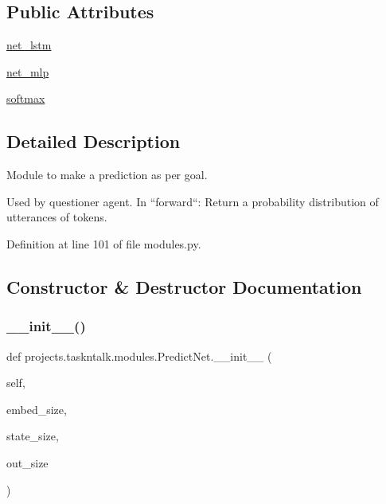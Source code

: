 \subsection*{Public Attributes}
\begin{DoxyCompactItemize}
\item 
\hyperlink{classprojects_1_1taskntalk_1_1modules_1_1PredictNet_ad1120f3386bd6612376876ba51804285}{net\+\_\+lstm}
\item 
\hyperlink{classprojects_1_1taskntalk_1_1modules_1_1PredictNet_ac4f309ddfe1d817c3d345f390604322e}{net\+\_\+mlp}
\item 
\hyperlink{classprojects_1_1taskntalk_1_1modules_1_1PredictNet_ade00e095f7c5b6a29284e514d7aaaf44}{softmax}
\end{DoxyCompactItemize}


\subsection{Detailed Description}
\begin{DoxyVerb}Module to make a prediction as per goal.

Used by questioner agent. In
``forward``: Return a probability distribution of utterances of tokens.
\end{DoxyVerb}
 

Definition at line 101 of file modules.\+py.



\subsection{Constructor \& Destructor Documentation}
\mbox{\label{classprojects_1_1taskntalk_1_1modules_1_1PredictNet_a5b052209d94ae50776738fbecb54f304}} 
\subsubsection{\texorpdfstring{\+\_\+\+\_\+init\+\_\+\+\_\+()}{\_\_init\_\_()}}
{\footnotesize\ttfamily def projects.\+taskntalk.\+modules.\+Predict\+Net.\+\_\+\+\_\+init\+\_\+\+\_\+ (\begin{DoxyParamCaption}\item[{}]{self,  }\item[{}]{embed\+\_\+size,  }\item[{}]{state\+\_\+size,  }\item[{}]{out\+\_\+size }\end{DoxyParamCaption})}



